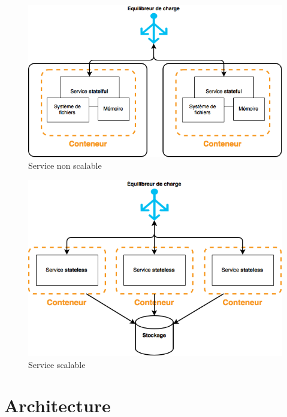 \begin{onehalfspace}
\begin{figure}[H]
\centering
\includegraphics [scale=0.5]{chapitre4/assets/stateful}
\caption{Service non scalable}
\label{fig:non-scalable}
\end{figure}

\begin{figure}[H]
\centering
\includegraphics [scale=0.5]{chapitre4/assets/stateless}
\caption{Service scalable}
\label{fig:scalable}
\end{figure}


\section{Architecture}


\end{onehalfspace}
